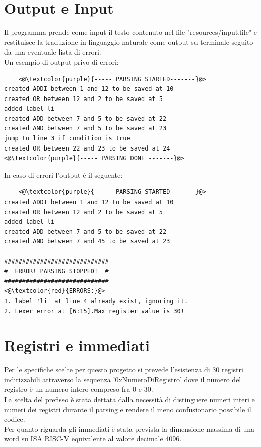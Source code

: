 \section{Output e Input}
Il programma prende come input il testo contenuto nel file "resources/input.file" e restituisce la traduzione in linguaggio naturale come output su terminale seguito da una eventuale lista di errori.
\\Un esempio di output privo di errori:
\begin{lstlisting}
    <@\textcolor{purple}{----- PARSING STARTED-------}@>
created ADDI between 1 and 12 to be saved at 10
created OR between 12 and 2 to be saved at 5
added label li
created ADD between 7 and 5 to be saved at 22
created AND between 7 and 5 to be saved at 23
jump to line 3 if condition is true
created OR between 22 and 23 to be saved at 24
<@\textcolor{purple}{----- PARSING DONE -------}@>
\end{lstlisting}
In caso di errori l'output è il seguente:
\begin{lstlisting}
    <@\textcolor{purple}{----- PARSING STARTED-------}@>
created ADDI between 1 and 12 to be saved at 10
created OR between 12 and 2 to be saved at 5
added label li
created ADD between 7 and 5 to be saved at 22
created AND between 7 and 45 to be saved at 23

#############################
#  ERROR! PARSING STOPPED!  #
#############################
<@\textcolor{red}{ERRORS:}@>
1. label 'li' at line 4 already exist, ignoring it.
2. Lexer error at [6:15].Max register value is 30!
\end{lstlisting}






\section{Registri e immediati}
Per le specifiche scelte per questo progetto si prevede l'esistenza di 30 registri indirizzabili attraverso la sequenza '0xNumeroDiRegistro' dove il numero del registro è un numero intero compreso fra 0 e 30.
\\La scelta del prefisso è stata dettata dalla necessità di distinguere numeri interi e numeri dei registri durante il parsing e rendere il meno confusionario possibile il codice.
\\Per quanto riguarda gli immediati è stata prevista la dimensione massima di una word su ISA RISC-V equivalente al valore decimale 4096.
